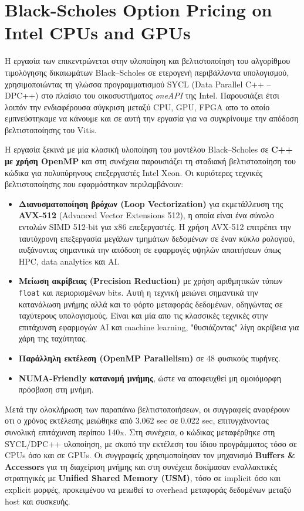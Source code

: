 \section{Black-Scholes Option Pricing on Intel CPUs and GPUs}

Η εργασία των \cite{black_scholes_option_pricing_intel_cpus_gpus} επικεντρώνεται στην υλοποίηση και βελτιστοποίηση του αλγορίθμου τιμολόγησης δικαιωμάτων Black–Scholes
σε ετερογενή περιβάλλοντα υπολογισμού, χρησιμοποιώντας τη γλώσσα προγραμματισμού SYCL (Data Parallel C++ – DPC++) στο πλαίσιο του οικοσυστήματος \textit{oneAPI} της Intel.
Παρουσιάζει έτσι λοιπόν την ενδιαφέρουσα σύγκριση μεταξύ CPU, GPU, FPGA απο το οποίο εμπνεύστηκαμε να κάνουμε και σε αυτή την εργασία για να συγκρίνουμε την απόδοση βελτιστοποίησης του Vitis. 

Η εργασία ξεκινά με μία κλασική υλοποίηση του μοντέλου Black–Scholes σε \textbf{C++ με χρήση OpenMP} και στη συνέχεια παρουσιάζει τη σταδιακή βελτιστοποίηση του 
κώδικα για πολυπύρηνους επεξεργαστές Intel Xeon. Οι κυριότερες τεχνικές βελτιστοποίησης που εφαρμόστηκαν περιλαμβάνουν:
\begin{itemize}
\item \textbf{Διανυσματοποίηση βρόχων (Loop Vectorization)} για εκμετάλλευση της \textbf{AVX-512} (Advanced Vector Extensions 512), η οποία είναι ένα σύνολο εντολών SIMD 512-bit για x86 επεξεργαστές.
Η χρήση AVX-512 επιτρέπει την ταυτόχρονη επεξεργασία μεγάλων τμημάτων δεδομένων σε έναν κύκλο ρολογιού, αυξάνοντας σημαντικά την απόδοση σε εφαρμογές υψηλών απαιτήσεων όπως HPC, data analytics και AI.
\item \textbf{Μείωση ακρίβειας (Precision Reduction)} με χρήση αριθμητικών τύπων \texttt{float} και περιορισμένων bits. Αυτή η τεχνική μειώνει σημαντικά την κατανάλωση μνήμης αλλά και το φόρτο μεταφοράς δεδομένων, οδηγώντας σε ταχύτερους υπολογισμούς.
Είναι και μία απο τις κλασσικές τεχνικές στην επιτάχυνση εφαρμογών AI και machine learning, "θυσιάζοντας" λίγη ακρίβεια για χάρη της ταχύτητας.
\item \textbf{Παράλληλη εκτέλεση (OpenMP Parallelism)} σε 48 φυσικούς πυρήνες.
\item \textbf{NUMA-Friendly κατανομή μνήμης}, ώστε να αποφευχθεί μη ομοιόμορφη πρόσβαση στη μνήμη.
\end{itemize}

Μετά την ολοκλήρωση των παραπάνω βελτιστοποιήσεων, οι συγγραφείς αναφέρουν οτι ο χρόνος εκτέλεσης μειώθηκε από 3.062 sec σε 0.022 sec, επιτυγχάνοντας συνολική επιτάχυνση περίπου 140x.  
Στη συνέχεια, ο κώδικας μεταφέρθηκε στη SYCL/DPC++ υλοποίηση, με σκοπό την εκτέλεση του ίδιου προγράμματος τόσο σε CPUs όσο και σε GPUs.
Οι συγγραφείς χρησιμοποίησαν τον μηχανισμό \textbf{Buffers \& Accessors} για τη διαχείριση μνήμης και στη συνέχεια δοκίμασαν εναλλακτικές στρατηγικές με \textbf{Unified Shared Memory (USM)},
τόσο σε implicit όσο και explicit μορφές, προκειμένου να μειωθεί το overhead μεταφοράς δεδομένων μεταξύ host και συσκευής.

